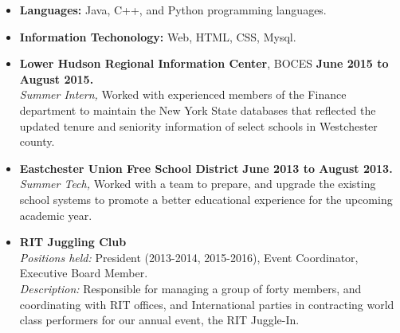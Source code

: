 \documentclass[11pt]{article}
\begin{document}
\vspace{1ex}
\begin{itemize} [topsep=.5ex, itemsep=0ex, partopsep=0ex, parsep=1ex]
	\item[] {\bf Languages:} Java, C++, and Python programming languages.
 	\item[] {\bf Information Techonology:} Web, HTML, CSS, Mysql.
\end{itemize}
\vspace{1ex}
\vspace{1ex}
\begin{itemize} [topsep=.5ex, itemsep=0ex, partopsep=0ex, parsep=1ex]
	\item[]{{\bf Lower Hudson Regional Information Center}, BOCES \hfill {\bf June 2015 to August 2015.}}\\
	{\it Summer Intern,}
	Worked with experienced members of the Finance department to maintain the New York
	State databases that reflected the updated tenure and seniority information of select schools in Westchester county.
	\item[]{{\bf Eastchester Union Free School District} \hfill { \bf June 2013 to August 2013.}}\\
		{\it Summer Tech,}
		{Worked with a team to prepare, and upgrade the existing school systems to promote a better educational experience for the upcoming academic year.}
\end{itemize}
\begin{itemize} [topsep=.5ex, itemsep=0ex, partopsep=0ex, parsep=1ex]
	\item[] {\bf RIT Juggling Club}\\
	{\it Positions held:}  President (2013-2014, 2015-2016), Event Coordinator, Executive Board Member.\\
	{\it Description:} Responsible for managing a group of forty members, and coordinating with RIT offices, and International parties in contracting world class performers for our annual event, the RIT Juggle-In.
\end{itemize}
\end{document}
